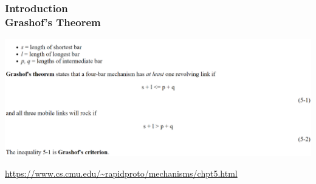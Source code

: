 \documentclass[ucs,10pt]{beamer}
\begin{document}
%	
	


\begin{frame}
\frametitle{Introduction \\
    \small \color{rwth-blue} Grashof's Theorem}

    \begin{center}
        \includegraphics[width=\linewidth]{./Figures/introduction/introduction_classification.png}
    \end{center}

    {\tiny \url{https://www.cs.cmu.edu/~rapidproto/mechanisms/chpt5.html}}
\end{frame}
\end{document}
